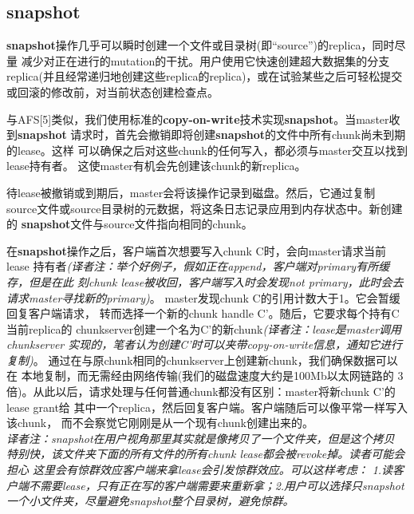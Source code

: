 \subsection{\textbf{snapshot}}
\textbf{snapshot}操作几乎可以瞬时创建一个文件或目录树(即“source”)的replica，同时尽量
减少对正在进行的mutation的干扰。用户使用它快速创建超大数据集的分支
replica(并且经常递归地创建这些replica的replica)，或在试验某些之后可轻松提交
或回滚的修改前，对当前状态创建检查点。

与AFS[5]类似，我们使用标准的\textbf{copy-on-write}技术实现\textbf{snapshot}。当master收到\textbf{snapshot}
请求时，首先会撤销即将创建\textbf{snapshot}的文件中所有chunk尚未到期的lease。这样
可以确保之后对这些chunk的任何写入，都必须与master交互以找到lease持有者。
这使master有机会先创建该chunk的新replica。

待lease被撤销或到期后，master会将该操作记录到磁盘。然后，它通过复制
source文件或source目录树的元数据，将这条日志记录应用到内存状态中。新创建的
\textbf{snapshot}文件与source文件指向相同的chunk。

在\textbf{snapshot}操作之后，客户端首次想要写入chunk C时，会向master请求当前lease
持有者\emph{(译者注：举个好例子，假如正在append，客户端对primary有所缓存，但是在此
刻chunk lease被收回，客户端写入时会发现not primary，此时会去请求master寻找新的primary)}。
master发现chunk C的引用计数大于1。它会暂缓回复客户端请求，
转而选择一个新的chunk handle C'。随后，它要求每个持有C当前replica的
chunkserver创建一个名为C'的新chunk\emph{(译者注：lease是master调用chunkserver
实现的，笔者认为创建C'时可以夹带copy-on-write信息，通知它进行复制)}。
通过在与原chunk相同的chunkserver上创建新chunk，我们确保数据可以在
本地复制，而无需经由网络传输(我们的磁盘速度大约是100Mb以太网链路的
3倍)。从此以后，请求处理与任何普通chunk都没有区别：master将新chunk C'的lease grant给
其中一个replica，然后回复客户端。客户端随后可以像平常一样写入该chunk，
而不会察觉它刚刚是从一个现有chunk创建出来的。
\\\emph{译者注：snapshot在用户视角那里其实就是像拷贝了一个文件夹，但是这个拷贝
特别快，该文件夹下面的所有文件的所有chunk lease都会被revoke掉。读者可能会担心
这里会有惊群效应客户端来拿lease会引发惊群效应。可以这样考虑：
1.读客户端不需要lease，只有正在写的客户端需要来重新拿；2.用户可以选择只snapshot
一个小文件夹，尽量避免snapshot整个目录树，避免惊群。}
